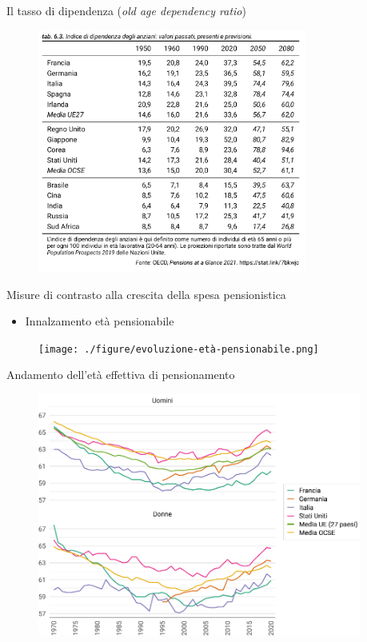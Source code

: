 \documentclass[11pt]{beamer}
\begin{document}
\begin{frame}{Il tasso di dipendenza  (\emph{old age dependency ratio})}
\begin{figure}[htbp]
\centering
\includegraphics[height=8cm]{./figure/old-age-dependency-ratio.png}
\end{figure}
\end{frame}


\begin{frame}{Misure di contrasto alla crescita della spesa pensionistica}
\begin{itemize}
\item Innalzamento età pensionabile
\end{itemize}

\begin{figure}[htbp]
\centering
\texttt{[image: ./figure/evoluzione-età-pensionabile.png]}
\end{figure}
\end{frame}


\begin{frame}{Andamento dell'età effettiva di pensionamento}
\begin{figure}[htbp]
\centering
\includegraphics[height=8cm]{./figure/eta-effettiva-pensionamento-color.pdf}
\end{figure}
\end{frame}
\end{document}
